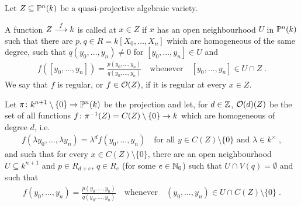 \documentclass[a4paper,parskip=half,numbers=enddot, DIV=12]{scrreprt}
\begin{document}
\begin{defi}
    Let $Z\subseteq\mathbb{P}^n(k)$ be a quasi-projective algebraic variety. 
    \begin{alphanumerate}
    	\item A function $Z\morphism[f] k$ is called  at $x\in Z$ if $x$ has an open neighbourhood $U$ in $\mathbb{P}^n(k)$ such that there are $p,q\in R = k[X_0,\ldots,X_n]$ which are homogeneous of the same degree, such that $q(y_0,\ldots,y_n) \neq 0$ for $[y_0,\ldots,y_n]\in U$ and
    	\begin{align*}
	    	f([y_0,\ldots,y_n]) = \frac{p(y_0,\ldots,y_n)}{q(y_0,\ldots,y_n)}\quad\text{whenever}\quad[y_0,\ldots, y_n]\in U\cap Z\;.
    	\end{align*}
    	We say that $f$ is regular, or $f\in \mathcal{O}(Z)$, if it is regular at every $x\in Z$.
    	\item  Let $\pi\colon k^{n+1}\setminus \{0\} \morphism \IP^n(k)$ be the projection and let, for $d\in \mathbb{Z}$, $\mathcal{O}(d)(Z)$ be the set of all functions $f\colon \pi^{-1}(Z) = C(Z)\setminus\{0\}\morphism k$ which are homogeneous of degree $d$, i.e.
    	\begin{align*}
	    	f(\lambda y_0,\ldots, \lambda y_n) = \lambda^d f(y_0,\ldots, y_n)\quad \text{for all }y\in C(Z)\setminus\{0\}\text{ and }\lambda \in k^\times\;, 
    	\end{align*}
    	and such that for every $x\in C(Z)\setminus\{0\}$, there are an open neighbourhood $U\subseteq k^{n+1}$ and $p\in R_{d+e}$, $q\in R_e$ (for some $e\in \mathbb{N}_0$) such that $U\cap V(q) = \emptyset$ and such that 
    	\begin{align*}
	    	f(y_0,\ldots, y_n) = \frac{p(y_0,\ldots, y_n)}{q(y_0,\ldots, y_n)}\quad\text{whenever}\quad(y_0,\ldots, y_n)\in U\cap C(Z)\setminus\{0\}\;. 
    	\end{align*}
    \end{alphanumerate}
    
    
\end{defi}
\end{document}
